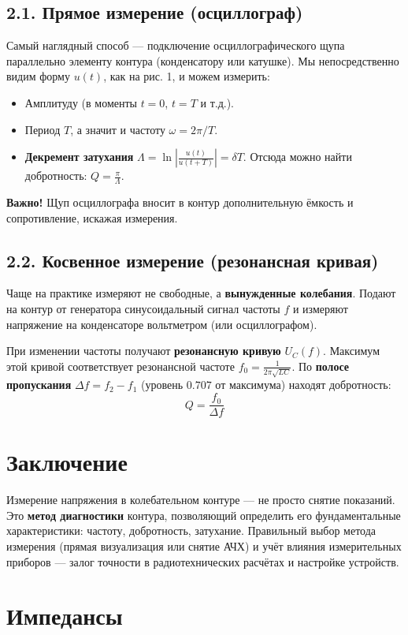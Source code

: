 \documentclass[a4paper]{article}
\begin{document}
\subsection*{2.1. Прямое измерение (осциллограф)}
Самый наглядный способ — подключение осциллографического щупа параллельно элементу контура (конденсатору или катушке). Мы непосредственно видим форму $u(t)$, как на рис. 1, и можем измерить:
\begin{itemize}
    \item Амплитуду (в моменты $t=0$, $t=T$ и т.д.).
    \item Период $T$, а значит и частоту $\omega = 2\pi / T$.
    \item \textbf{Декремент затухания} $\Lambda = \ln\left|\frac{u(t)}{u(t+T)}\right| = \delta T$. Отсюда можно найти добротность: $Q = \frac{\pi}{\Lambda}$.
\end{itemize}
\textbf{Важно!} Щуп осциллографа вносит в контур дополнительную ёмкость и сопротивление, искажая измерения.

\subsection*{2.2. Косвенное измерение (резонансная кривая)}
Чаще на практике измеряют не свободные, а \textbf{вынужденные колебания}. Подают на контур от генератора синусоидальный сигнал частоты $f$ и измеряют напряжение на конденсаторе вольтметром (или осциллографом).

При изменении частоты получают \textbf{резонансную кривую} $U_C(f)$. Максимум этой кривой соответствует резонансной частоте $f_0 = \frac{1}{2\pi\sqrt{LC}}$. По \textbf{полосе пропускания} $\Delta f = f_2 - f_1$ (уровень $0.707$ от максимума) находят добротность:
\begin{equation}
\boxed{Q = \frac{f_0}{\Delta f}}
\end{equation}

\section*{Заключение}
Измерение напряжения в колебательном контуре — не просто снятие показаний. Это \textbf{метод диагностики} контура, позволяющий определить его фундаментальные характеристики: частоту, добротность, затухание. Правильный выбор метода измерения (прямая визуализация или снятие АЧХ) и учёт влияния измерительных приборов — залог точности в радиотехнических расчётах и настройке устройств.

\section{Импедансы}
\end{document}
